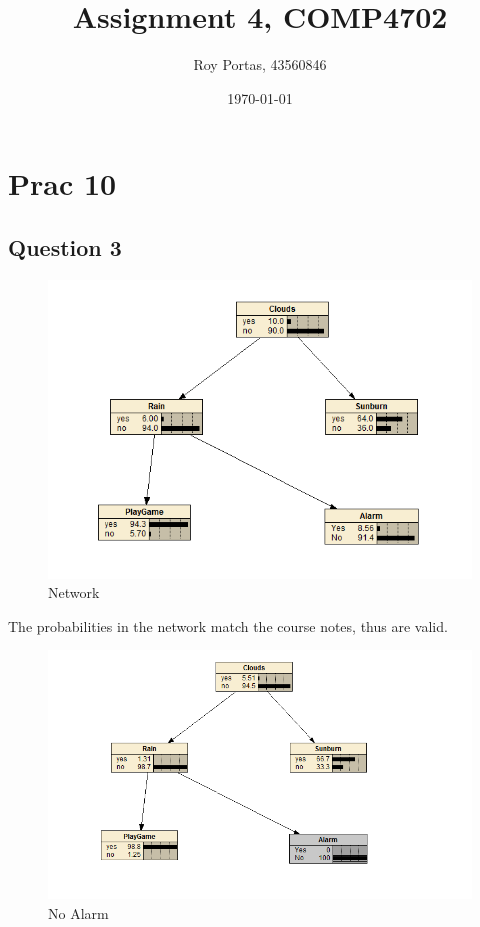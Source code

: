 
\usepackage{mathtools}
\usepackage{url}

\title{Assignment 4, COMP4702}
\author{Roy Portas, 43560846}
\date{\today}

 
\begin{titlepage}
    \maketitle
\end{titlepage}

\section*{Prac 10}

\subsection*{Question 3}

\begin{figure}[H]
    \includegraphics[width=\linewidth]{../../pracs/prac10/q3_network}
    \centering
    \caption{Network}
\end{figure}

The probabilities in the network match the course notes, thus are valid.

\begin{figure}[H]
    \includegraphics[width=\linewidth]{../../pracs/prac10/q3_no_rain}
    \centering
    \caption{No Alarm}
\end{figure}

